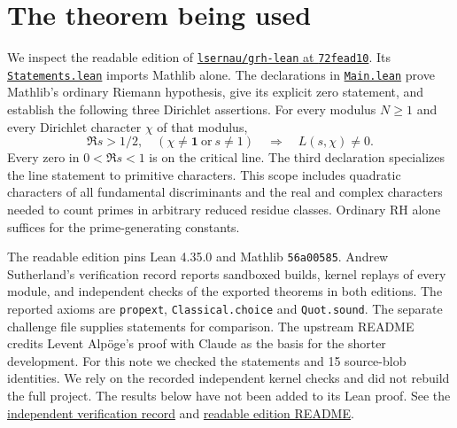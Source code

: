 \documentclass[11pt]{article}
\theoremstyle{remark}\newtheorem{remark}[theorem]{Remark}
\begin{document}
\section{The theorem being used}
We inspect the readable edition of \href{https://github.com/lsernau/grh-lean/tree/72fead102f663d5c7a407964a13dc0cf9d977207}{\texttt{lsernau/grh-lean} at \texttt{72fead10}}. Its \href{https://github.com/lsernau/grh-lean/blob/72fead102f663d5c7a407964a13dc0cf9d977207/grh/src/Statements.lean}{\texttt{Statements.lean}} imports Mathlib alone. The declarations in \href{https://github.com/lsernau/grh-lean/blob/72fead102f663d5c7a407964a13dc0cf9d977207/grh/src/Main.lean}{\texttt{Main.lean}} prove Mathlib's ordinary Riemann hypothesis, give its explicit zero statement, and establish the following three Dirichlet assertions. For every modulus $N\ge1$ and every Dirichlet character $\chi$ of that modulus,
\[
 \Re s>1/2,\quad (\chi\ne\mathbf1\ \text{or}\ s\ne1)
        \quad\Longrightarrow\quad L(s,\chi)\ne0.
\]
Every zero in $0<\Re s<1$ is on the critical line. The third declaration specializes the line statement to primitive characters. This scope includes quadratic characters of all fundamental discriminants and the real and complex characters needed to count primes in arbitrary reduced residue classes. Ordinary RH alone suffices for the prime-generating constants.

The readable edition pins Lean 4.35.0 and Mathlib \texttt{56a00585}. Andrew Sutherland's verification record reports sandboxed builds, kernel replays of every module, and independent checks of the exported theorems in both editions. The reported axioms are \texttt{propext}, \texttt{Classical.choice} and \texttt{Quot.sound}. The separate challenge file supplies statements for comparison. The upstream README credits Levent Alp\"oge's proof with Claude as the basis for the shorter development. For this note we checked the statements and 15 source-blob identities. We rely on the recorded independent kernel checks and did not rebuild the full project. The results below have not been added to its Lean proof. See the \href{https://math.mit.edu/~drew/shortgrh/}{independent verification record} and \href{https://github.com/lsernau/grh-lean/blob/72fead102f663d5c7a407964a13dc0cf9d977207/grh/README.md}{readable edition README}.
\end{document}
